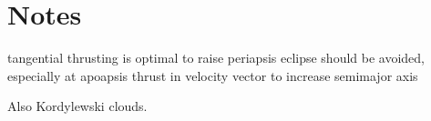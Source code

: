 \part{Notes}





tangential thrusting is optimal to raise periapsis
eclipse should be avoided, especially at apoapsis
thrust in velocity vector to increase semimajor axis 
\textcite{Racca9}





Also Kordylewski clouds.

